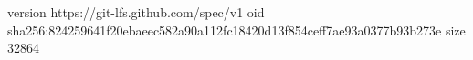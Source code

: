 version https://git-lfs.github.com/spec/v1
oid sha256:824259641f20ebaeec582a90a112fc18420d13f854ceff7ae93a0377b93b273e
size 32864
